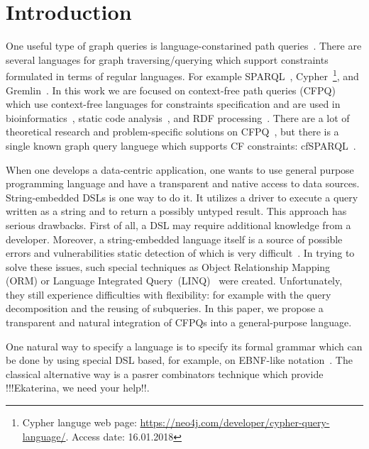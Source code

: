 \section{Introduction}

One useful type of graph queries is language-constarined path queries~\cite{FLCpathProblem}.
There are several languages for graph traversing/querying which support constraints formulated in terms of regular languages.
For example SPARQL~\cite{sparql}, Cypher~\footnote{Cypher languge web page: \url{https://neo4j.com/developer/cypher-query-language/}. Access date: 16.01.2018}, and Gremlin~\cite{gremlin}.
In this work we are focused on context-free path queries (CFPQ) which use context-free languages for constraints specification and are used in bioinformatics~\cite{GraphQueryWithEarley}, static code analysis~\cite{Reps, Zheng, LabelFlowCFLReachability, specificationCFLReachability}, and RDF processing~\cite{CFGonRDF}. 
There are a lot of theoretical research and problem-specific solutions on CFPQ~\cite{Yannakakis, ConjCFPathQuery, Hellings16, QueryGraphWithData, RegularDBQuery, GraphQueryWithEarley, graphDB}, but there is a single known graph query languege which supports CF constraints: cfSPARQL~\cite{CFGonRDF}.

When one develops a data-centric application, one wants to use general purpose programming language and have a transparent and native access to data sources.
String-embedded DSLs is one way to do it. It utilizes a driver to execute a query written as a string and to return a possibly untyped result. This approach has serious drawbacks.
First of all, a DSL may require additional knowledge from a developer.
Moreover, a string-embedded language itself is a source of possible errors and vulnerabilities static detection of which is very difficult~\cite{stringEmbeddedLanguagesProblem}.  
In trying to solve these issues, such special techniques as Object Relationship Mapping (ORM) or Language Integrated Query~(LINQ)~\cite{LINQ1, LINQ2, LinqRDF} were created. Unfortunately, they still experience difficulties with flexibility: for example with the query decomposition and the reusing of subqueries.
In this paper, we propose a transparent and natural integration of CFPQs into  a general-purpose language. 

One natural way to specify a language is to specify its formal grammar which can be done by using special DSL based, for example, on EBNF-like notation~\cite{EBNFISO}.
The classical alternative way is a pasrer combinators technique which provide !!!Ekaterina, we need your help!!.


